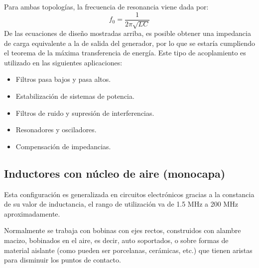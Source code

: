 \documentclass{article}
\begin{document}
\noindent Para ambas topologías, la frecuencia de resonancia viene dada por:
\begin{equation*}
    f_0 = \frac{1}{2\pi \sqrt{LC}}
\end{equation*}
\noindent De las ecuaciones de diseño mostradas arriba, es posible obtener una impedancia de carga equivalente a la de salida del generador, por lo que se estaría cumpliendo el teorema de la máxima transferencia de energía.
Este tipo de acoplamiento es utilizado en las siguientes aplicaciones:
\begin{itemize}
    \item Filtros pasa bajos y pasa altos.
    \item Estabilización de sistemas de potencia.
    \item Filtros de ruido y supresión de interferencias.
    \item Resonadores y osciladores.
    \item Compensación de impedancias.
\end{itemize}
\subsection{Inductores con núcleo de aire (monocapa)}
Esta configuración es generalizada en circuitos electrónicos gracias a la constancia de su valor de inductancia, el rango de utilización va de 1.5 MHz a 200 MHz aproximadamente. 

Normalmente se trabaja con bobinas con ejes rectos, construidos con alambre macizo, bobinados en el aire, es decir, auto soportados, o sobre formas de material aislante (como pueden ser porcelanas, cerámicas, etc.) que tienen aristas para disminuir los puntos de contacto.
\end{document}
